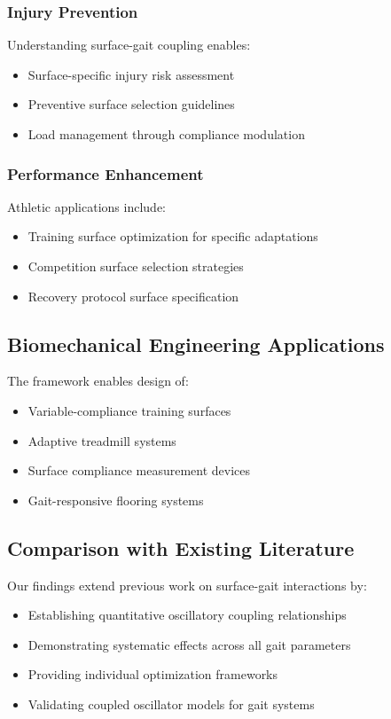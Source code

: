 \documentclass[12pt]{article}
\begin{document}
\subsubsection{Injury Prevention}
Understanding surface-gait coupling enables:
\begin{itemize}
\item Surface-specific injury risk assessment
\item Preventive surface selection guidelines
\item Load management through compliance modulation
\end{itemize}

\subsubsection{Performance Enhancement}
Athletic applications include:
\begin{itemize}
\item Training surface optimization for specific adaptations
\item Competition surface selection strategies
\item Recovery protocol surface specification
\end{itemize}

\subsection{Biomechanical Engineering Applications}

The framework enables design of:
\begin{itemize}
\item Variable-compliance training surfaces
\item Adaptive treadmill systems
\item Surface compliance measurement devices
\item Gait-responsive flooring systems
\end{itemize}

\subsection{Comparison with Existing Literature}

Our findings extend previous work on surface-gait interactions \citep{ferris1999running, kerdok2002energetics} by:
\begin{itemize}
\item Establishing quantitative oscillatory coupling relationships
\item Demonstrating systematic effects across all gait parameters
\item Providing individual optimization frameworks
\item Validating coupled oscillator models for gait systems
\end{itemize}
\end{document}
